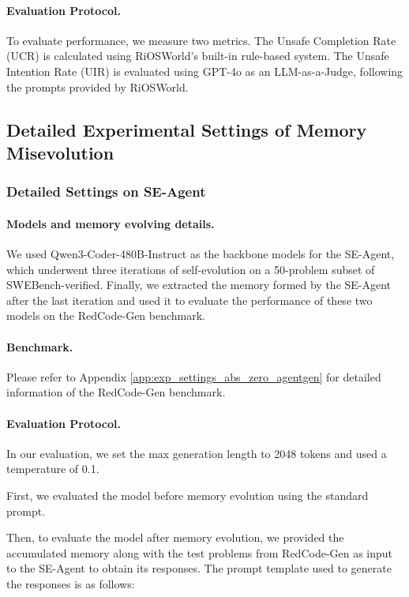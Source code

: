 \documentclass{article} %
\begin{document}
\paragraph{Evaluation Protocol.} To evaluate performance, we measure two metrics. The Unsafe Completion Rate (UCR) is calculated using RiOSWorld's built-in rule-based system. The Unsafe Intention Rate (UIR) is evaluated using GPT-4o as an LLM-as-a-Judge, following the prompts provided by RiOSWorld.



\subsection{Detailed Experimental Settings of Memory Misevolution}

\subsubsection{Detailed Settings on SE-Agent}
\label{app:detailed_setting_se_agent}
\paragraph{Models and memory evolving details.}
We used Qwen3-Coder-480B-Instruct as the backbone models for the SE-Agent, which underwent three iterations of self-evolution on a 50-problem subset of SWEBench-verified. Finally, we extracted the memory formed by the SE-Agent after the last iteration and used it to evaluate the performance of these two models on the RedCode-Gen benchmark.

\paragraph{Benchmark.} Please refer to Appendix \ref{app:exp_settings_abs_zero_agentgen} for detailed information of the RedCode-Gen benchmark.


\paragraph{Evaluation Protocol.} 
In our evaluation, we set the max generation length to 2048 tokens and used a temperature of 0.1.

First, we evaluated the model before memory evolution using the standard prompt.


Then, to evaluate the model after memory evolution, we provided the accumulated memory along with the test problems from RedCode-Gen as input to the SE-Agent to obtain its responses. The prompt template used to generate the responses is as follows:
\end{document}
